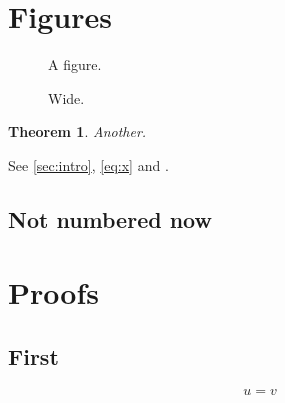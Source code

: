 \documentclass[11pt,a4paper]{article}
\newtheorem{thm}{Theorem}[section]
\begin{document}
\section{Figures}\label{sec:fig}
\begin{figure}[h]
  \centering
  \caption[Short]{A figure.}\label{fig:a}
\end{figure}
\begin{table}
  \caption{A table.}\label{tab:a}
\end{table}
\begin{figure}
  \caption{Wide.}\label{fig:b}
\end{figure}
\begin{thm}\label{thm:two}
  Another.
\end{thm}
See \ref{sec:intro}, \eqref{eq:x} and \cite[p.~3]{knuth,lamport}.
\setcounter{secnumdepth}{1}
\subsection{Not numbered now}\label{sec:nonum}
\appendix
\section{Proofs}\label{sec:proofs}
\subsection{First}\label{sec:proofs1}
\begin{equation}\label{eq:app}
  u = v
\end{equation}


\end{document}
